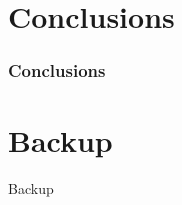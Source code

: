 \documentclass[10 pt,compress,mathserif]{beamer}
\begin{document}
\section{Conclusions}
\begin{frame}
 \frametitle{Conclusions}

\end{frame}

\appendix
{}
\setcounter{finalframe}{\value{framenumber}}

\section{Backup}
\begin{frame}
 \begin{center}
  \begin{LARGE}
   Backup
  \end{LARGE}
 \end{center}
\end{frame}



\setcounter{framenumber}{\value{finalframe}}
\end{document}
